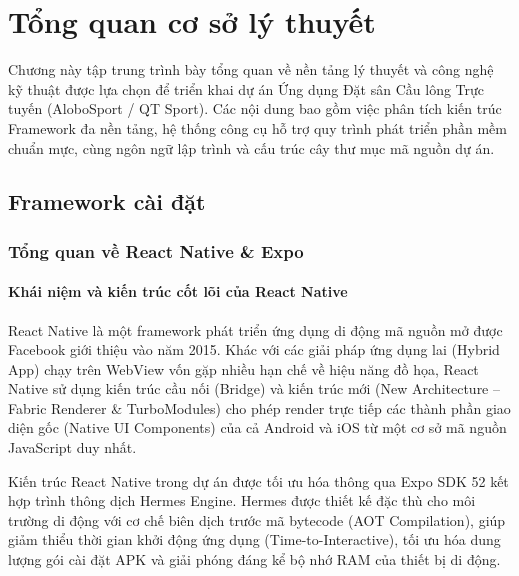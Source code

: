 \chapter{Tổng quan cơ sở lý thuyết}
\label{ch:tong-quan-ly-thuyet}

\begin{muctieu}
Chương này tập trung trình bày tổng quan về nền tảng lý thuyết và công nghệ kỹ thuật được lựa chọn để triển khai dự án Ứng dụng Đặt sân Cầu lông Trực tuyến (AloboSport / QT Sport). Các nội dung bao gồm việc phân tích kiến trúc Framework đa nền tảng, hệ thống công cụ hỗ trợ quy trình phát triển phần mềm chuẩn mực, cùng ngôn ngữ lập trình và cấu trúc cây thư mục mã nguồn dự án.
\end{muctieu}

\section{Framework cài đặt}
\label{sec:framework-cai-dat}

\subsection{Tổng quan về React Native \& Expo}
\subsubsection{Khái niệm và kiến trúc cốt lõi của React Native}
React Native là một framework phát triển ứng dụng di động mã nguồn mở được Facebook giới thiệu vào năm 2015. Khác với các giải pháp ứng dụng lai (Hybrid App) chạy trên WebView vốn gặp nhiều hạn chế về hiệu năng đồ họa, React Native sử dụng kiến trúc cầu nối (Bridge) và kiến trúc mới (New Architecture -- Fabric Renderer \& TurboModules) cho phép render trực tiếp các thành phần giao diện gốc (Native UI Components) của cả Android và iOS từ một cơ sở mã nguồn JavaScript duy nhất.

Kiến trúc React Native trong dự án được tối ưu hóa thông qua Expo SDK 52 kết hợp trình thông dịch Hermes Engine. Hermes được thiết kế đặc thù cho môi trường di động với cơ chế biên dịch trước mã bytecode (AOT Compilation), giúp giảm thiểu thời gian khởi động ứng dụng (Time-to-Interactive), tối ưu hóa dung lượng gói cài đặt APK và giải phóng đáng kể bộ nhớ RAM của thiết bị di động.

